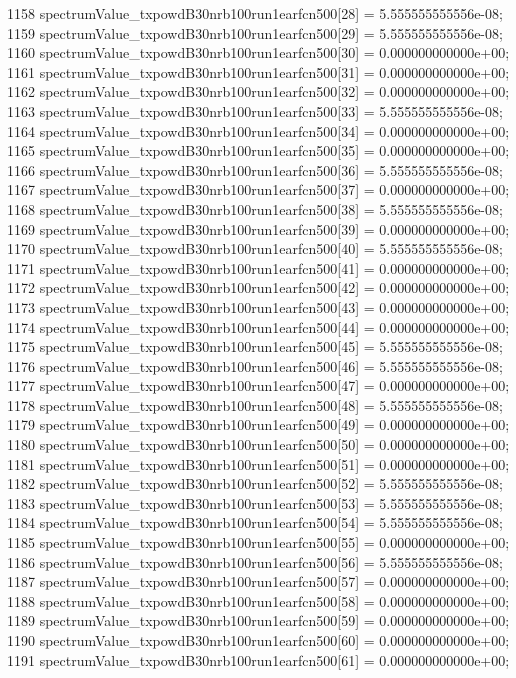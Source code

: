 \begin{DoxyCode}
1158   spectrumValue\_txpowdB30nrb100run1earfcn500[28] = 5.555555555556e-08;
1159   spectrumValue\_txpowdB30nrb100run1earfcn500[29] = 5.555555555556e-08;
1160   spectrumValue\_txpowdB30nrb100run1earfcn500[30] = 0.000000000000e+00;
1161   spectrumValue\_txpowdB30nrb100run1earfcn500[31] = 0.000000000000e+00;
1162   spectrumValue\_txpowdB30nrb100run1earfcn500[32] = 0.000000000000e+00;
1163   spectrumValue\_txpowdB30nrb100run1earfcn500[33] = 5.555555555556e-08;
1164   spectrumValue\_txpowdB30nrb100run1earfcn500[34] = 0.000000000000e+00;
1165   spectrumValue\_txpowdB30nrb100run1earfcn500[35] = 0.000000000000e+00;
1166   spectrumValue\_txpowdB30nrb100run1earfcn500[36] = 5.555555555556e-08;
1167   spectrumValue\_txpowdB30nrb100run1earfcn500[37] = 0.000000000000e+00;
1168   spectrumValue\_txpowdB30nrb100run1earfcn500[38] = 5.555555555556e-08;
1169   spectrumValue\_txpowdB30nrb100run1earfcn500[39] = 0.000000000000e+00;
1170   spectrumValue\_txpowdB30nrb100run1earfcn500[40] = 5.555555555556e-08;
1171   spectrumValue\_txpowdB30nrb100run1earfcn500[41] = 0.000000000000e+00;
1172   spectrumValue\_txpowdB30nrb100run1earfcn500[42] = 0.000000000000e+00;
1173   spectrumValue\_txpowdB30nrb100run1earfcn500[43] = 0.000000000000e+00;
1174   spectrumValue\_txpowdB30nrb100run1earfcn500[44] = 0.000000000000e+00;
1175   spectrumValue\_txpowdB30nrb100run1earfcn500[45] = 5.555555555556e-08;
1176   spectrumValue\_txpowdB30nrb100run1earfcn500[46] = 5.555555555556e-08;
1177   spectrumValue\_txpowdB30nrb100run1earfcn500[47] = 0.000000000000e+00;
1178   spectrumValue\_txpowdB30nrb100run1earfcn500[48] = 5.555555555556e-08;
1179   spectrumValue\_txpowdB30nrb100run1earfcn500[49] = 0.000000000000e+00;
1180   spectrumValue\_txpowdB30nrb100run1earfcn500[50] = 0.000000000000e+00;
1181   spectrumValue\_txpowdB30nrb100run1earfcn500[51] = 0.000000000000e+00;
1182   spectrumValue\_txpowdB30nrb100run1earfcn500[52] = 5.555555555556e-08;
1183   spectrumValue\_txpowdB30nrb100run1earfcn500[53] = 5.555555555556e-08;
1184   spectrumValue\_txpowdB30nrb100run1earfcn500[54] = 5.555555555556e-08;
1185   spectrumValue\_txpowdB30nrb100run1earfcn500[55] = 0.000000000000e+00;
1186   spectrumValue\_txpowdB30nrb100run1earfcn500[56] = 5.555555555556e-08;
1187   spectrumValue\_txpowdB30nrb100run1earfcn500[57] = 0.000000000000e+00;
1188   spectrumValue\_txpowdB30nrb100run1earfcn500[58] = 0.000000000000e+00;
1189   spectrumValue\_txpowdB30nrb100run1earfcn500[59] = 0.000000000000e+00;
1190   spectrumValue\_txpowdB30nrb100run1earfcn500[60] = 0.000000000000e+00;
1191   spectrumValue\_txpowdB30nrb100run1earfcn500[61] = 0.000000000000e+00;

\end{DoxyCode}
